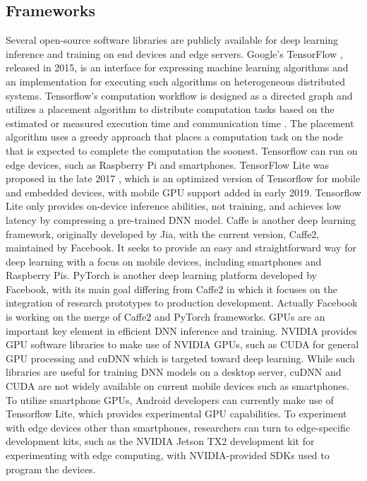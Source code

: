 \subsection{Frameworks}
Several open-source software libraries are publicly available for deep learning inference and training on end devices and edge servers. Google’s TensorFlow \cite{tensorflow2015-whitepaper}, released in 2015, is an interface for expressing machine learning algorithms and an implementation for executing such algorithms on heterogeneous distributed systems. Tensorflow's computation workflow is designed as a directed graph and utilizes a placement algorithm to distribute computation tasks based on the estimated or measured execution time and communication time \cite{abadi2016tensorflow}. The placement algorithm uses a greedy approach that places a computation task on the node that is expected to complete the computation the soonest. Tensorflow can run on edge devices, such as Raspberry Pi and smartphones. TensorFlow Lite was proposed in the late 2017 \cite{tensorflowlite}, which is an optimized version of Tensorflow for mobile and embedded devices, with mobile GPU support added in early 2019. 
Tensorflow Lite only provides on-device inference abilities, not training, and achieves low latency by compressing a pre-trained DNN model.
Caffe \cite{Caffe} is another deep learning framework, originally developed by Jia, with the current version, Caffe2, maintained by Facebook. It seeks to provide an easy and straightforward way for deep learning with a focus on mobile devices, including smartphones and Raspberry Pis. PyTorch \cite{NEURIPS2019_9015} is another deep learning platform developed by Facebook, with its main goal differing from Caffe2 in which it focuses on the integration of research prototypes to production development. Actually Facebook is working on the merge of Caffe2 and PyTorch frameworks.
GPUs are an important key element in efficient DNN inference and training. NVIDIA provides GPU software libraries to make use of NVIDIA GPUs, such as CUDA \cite{CUDA} for general GPU processing and cuDNN \cite{cuDNN} which is targeted toward deep learning. While such libraries are useful for training DNN models on a desktop server, cuDNN and CUDA are not widely available on current mobile devices such as smartphones. To utilize smartphone GPUs, Android developers can currently make use of Tensorflow Lite, which provides experimental GPU capabilities. To experiment with edge devices other than smartphones, researchers can turn to edge-specific development kits, such as the NVIDIA Jetson TX2 development kit for experimenting with edge computing, with NVIDIA-provided SDKs used to program the devices.



